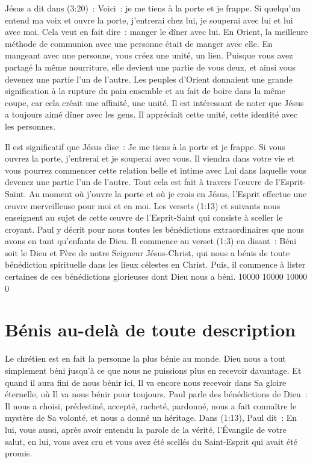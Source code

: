 Jésus a dit dans (3:20)~:
 \og Voici~: je me tiens à la porte et je frappe.
 Si quelqu'un entend ma voix et ouvre la porte,
 j'entrerai chez lui, je souperai avec lui et lui avec moi. \fg{}
 Cela veut en fait dire~: \og manger le dîner avec lui. \fg{}
 En Orient, la meilleure méthode de communion avec une personne
 était de manger avec elle. En mangeant avec une personne,
 vous créez une unité, un lien.
 Puisque vous avez partagé la même nourriture, elle devient une partie
 de vous deux, et ainsi vous devenez une partie l'un de l'autre.
 Les peuples d'Orient donnaient une grande signification à la rupture
 du pain ensemble et au fait de boire dans la même coupe,
 car cela créait une affinité, une unité.
 Il est intéressant de noter que Jésus a toujours aimé dîner avec les gens.
 Il appréciait cette unité, cette identité avec les personnes.


Il est significatif que Jésus dise~:
 \og Je me tiens à la porte et je frappe.
 Si vous ouvrez la porte, j'entrerai et je souperai avec vous. \fg{}
 Il viendra dans votre vie et vous pourrez commencer cette relation belle
 et intime avec Lui dans laquelle vous devenez une partie l'un de l'autre.
 Tout cela est fait à travers l'œuvre de l'Esprit-Saint.
 Au moment où j'ouvre la porte et où je crois en Jésus,
 l'Esprit effectue une œuvre merveilleuse pour moi et en moi.
 Les versets (1:13) et suivants nous enseignent
 au sujet de cette œuvre de l'Esprit-Saint qui consiste à sceller le croyant.
 Paul y décrit pour nous toutes les bénédictions extraordinaires
 que nous avons en tant qu'enfants de Dieu.
 Il commence au verset (1:3) en disant~:
 \og Béni soit le Dieu et Père de notre Seigneur Jésus-Christ,
 qui nous a bénis de toute bénédiction spirituelle
 dans les lieux célestes en Christ. \fg{}
 Puis, il commence à lister certaines de ces bénédictions glorieuses
 dont Dieu nous a béni.
 \begingroup{} 10000 10000 10000 0
 \par\endgroup


\section{B\'enis au-del\`a de toute description}

Le chrétien est en fait la personne la plus bénie au monde.
 Dieu nous a tout simplement béni jusqu'à ce que nous ne puissions plus
 en recevoir davantage.
 Et quand il aura fini de nous bénir ici, Il va encore nous recevoir
 dans Sa gloire éternelle, où Il va nous bénir pour toujours.
 Paul parle des bénédictions de Dieu~: Il nous a choisi, prédestiné,
 accepté, racheté, pardonné, nous a fait connaître
 le mystère de Sa volonté, et nous a donné un héritage.
 Dans (1:13), Paul dit~:
 \og En lui, vous aussi, après avoir entendu la parole de la vérité,
 l'Évangile de votre salut, en lui, vous avez cru et vous avez été scellés
 du Saint-Esprit qui avait été promis. \fg{}

